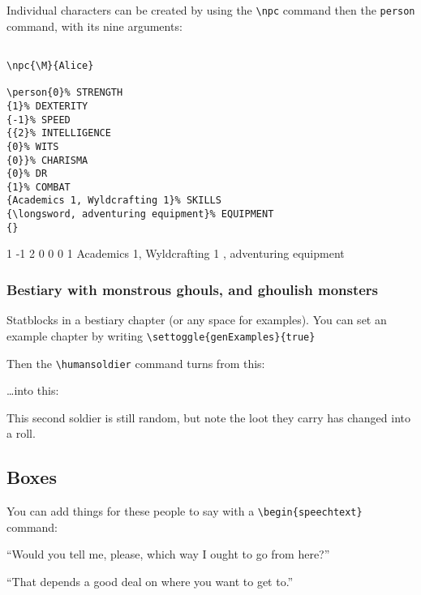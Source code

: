 \documentclass[a4paper,openany]{book}
\begin{document}
\begin{multicols}{2}
Individual characters can be created by using the \verb"\npc" command then the \verb"person" command, with its nine arguments:

\begin{verbatim}

\npc{\M}{Alice}

\person{0}% STRENGTH
{1}% DEXTERITY 
{-1}% SPEED
{{2}% INTELLIGENCE
{0}% WITS
{0}}% CHARISMA
{0}% DR
{1}% COMBAT
{Academics 1, Wyldcrafting 1}% SKILLS
{\longsword, adventuring equipment}% EQUIPMENT
{}

\end{verbatim}

{1}%
{-1}%
{{2}%
{0}%
{0}}%
{0}%
{1}%
{Academics 1, Wyldcrafting 1}%
{\longsword, adventuring equipment}%
{}

\subsubsection{Bestiary with monstrous ghouls, and ghoulish monsters}

Statblocks in a bestiary chapter (or any space for examples).
You can set an example chapter by writing \verb"\settoggle{genExamples}{true}"

Then the \verb"\humansoldier" command turns from this:

\humansoldier

\ldots into this:


\humansoldier

This second soldier is still random, but note the loot they carry has changed into a roll.

\subsection{Boxes}

You can add things for these people to say with a \verb"\begin{speechtext}" command:

\begin{speechtext}

  ``Would you tell me, please, which way I ought to go from here?''

  ``That depends a good deal on where you want to get to.''

\end{speechtext}


\end{multicols}
\end{document}
